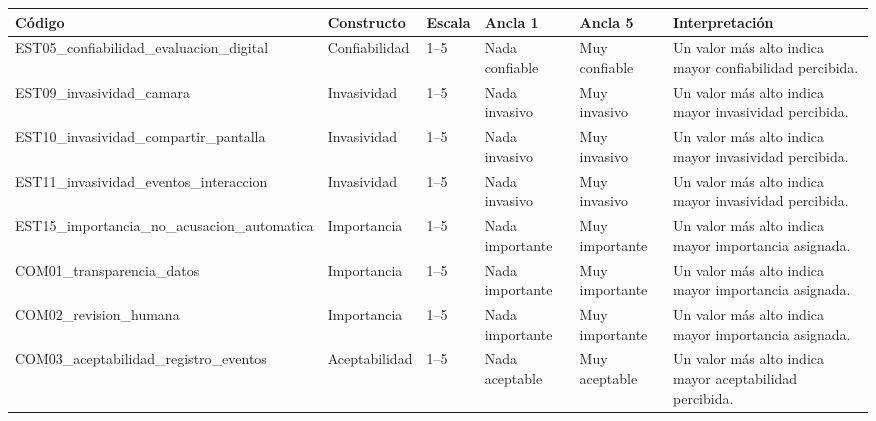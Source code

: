 \begin{center}\footnotesize
\begin{longtable}{@{}p{3.2cm}p{2.1cm}p{1.6cm}p{2.1cm}p{2.1cm}p{2.6cm}@{}}
\toprule
\rowcolor{accent!15}\textbf{Código} & \textbf{Constructo} & \textbf{Escala} & \textbf{Ancla 1} & \textbf{Ancla 5} & \textbf{Interpretación} \\
\midrule\endhead
EST05\_\allowbreak confiabilidad\_\allowbreak evaluacion\_\allowbreak digital & Confiabilidad & 1--5 & Nada confiable & Muy confiable & Un valor más alto indica mayor confiabilidad percibida. \\
EST09\_\allowbreak invasividad\_\allowbreak camara & Invasividad & 1--5 & Nada invasivo & Muy invasivo & Un valor más alto indica mayor invasividad percibida. \\
EST10\_\allowbreak invasividad\_\allowbreak compartir\_\allowbreak pantalla & Invasividad & 1--5 & Nada invasivo & Muy invasivo & Un valor más alto indica mayor invasividad percibida. \\
EST11\_\allowbreak invasividad\_\allowbreak eventos\_\allowbreak interaccion & Invasividad & 1--5 & Nada invasivo & Muy invasivo & Un valor más alto indica mayor invasividad percibida. \\
EST15\_\allowbreak importancia\_\allowbreak no\_\allowbreak acusacion\_\allowbreak automatica & Importancia & 1--5 & Nada importante & Muy importante & Un valor más alto indica mayor importancia asignada. \\
COM01\_\allowbreak transparencia\_\allowbreak datos & Importancia & 1--5 & Nada importante & Muy importante & Un valor más alto indica mayor importancia asignada. \\
COM02\_\allowbreak revision\_\allowbreak humana & Importancia & 1--5 & Nada importante & Muy importante & Un valor más alto indica mayor importancia asignada. \\
COM03\_\allowbreak aceptabilidad\_\allowbreak registro\_\allowbreak eventos & Aceptabilidad & 1--5 & Nada aceptable & Muy aceptable & Un valor más alto indica mayor aceptabilidad percibida. \\
\bottomrule
\end{longtable}
\end{center}